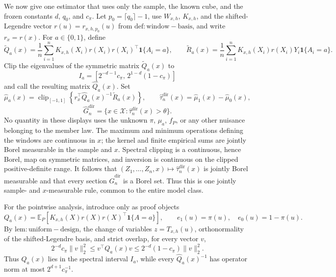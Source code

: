 We now give one estimator that uses only the sample, the known cube, and the frozen constants \(d\), \(q_0\), and \(c_\pi\). Let \(p_0=\lceil q_0\rceil-1\), use \(W_{x,h}\), \(K_{x,h}\), and the shifted-Legendre vector \(r(u)=r_{x,h,p_0}(u)\) from \(\mathrm{def:window-basis}\), and write \(r_x=r(x)\). For \(a\in\{0,1\}\), define
\[
\widetilde Q_a(x)=\frac1n\sum_{i=1}^nK_{x,h}(X_i)r(X_i)r(X_i)^\top\mathbf 1\{A_i=a\},
\qquad
\widetilde R_a(x)=\frac1n\sum_{i=1}^nK_{x,h}(X_i)r(X_i)Y_i\mathbf 1\{A_i=a\}.
\]
Clip the eigenvalues of the symmetric matrix \(\widetilde Q_a(x)\) to
\[
I_a=[2^{-d-1}c_\pi,\,2^{1-d}(1-c_\pi)]
\]
and call the resulting matrix \(\widehat Q_a(x)\). Set
\[
\widehat\mu_a(x)=\operatorname{clip}_{[-1,1]}\!\left\{r_x^\top\widehat Q_a(x)^{-1}\widetilde R_a(x)\right\},
\qquad
\widehat\tau_n^{\mathrm{dir}}(x)=\widehat\mu_1(x)-\widehat\mu_0(x),
\]
\[
\widehat G_n^{\mathrm{dir}}=\{x\in\mathcal X:\widehat\tau_n^{\mathrm{dir}}(x)>\theta\}.
\]
No quantity in these displays uses the unknown \(\pi\), \(\mu_a\), \(f_P\), or any other nuisance belonging to the member law. The maximum and minimum operations defining the windows are continuous in \(x\); the kernel and finite empirical sums are jointly Borel measurable in the sample and \(x\). Spectral clipping is a continuous, hence Borel, map on symmetric matrices, and inversion is continuous on the clipped positive-definite range. It follows that \((Z_1,\ldots,Z_n,x)\mapsto\widehat\tau_n^{\mathrm{dir}}(x)\) is jointly Borel measurable and that every section \(\widehat G_n^{\mathrm{dir}}\) is a Borel set. Thus this is one jointly sample- and \(x\)-measurable rule, common to the entire model class.

For the pointwise analysis, introduce only as proof objects
\[
Q_a(x)=\mathbb E_P\!\left[K_{x,h}(X)r(X)r(X)^\top\mathbf 1\{A=a\}\right],
\qquad e_1(u)=\pi(u),\quad e_0(u)=1-\pi(u).
\]
By \(\mathrm{lem:uniform-design}\), the change of variables \(z=T_{x,h}(u)\), orthonormality of the shifted-Legendre basis, and strict overlap, for every vector \(v\),
\[
2^{-d}c_\pi\|v\|_2^2
\le v^\top Q_a(x)v
\le2^{-d}(1-c_\pi)\|v\|_2^2.
\]
Thus \(Q_a(x)\) lies in the spectral interval \(I_a\), while every \(\widehat Q_a(x)^{-1}\) has operator norm at most \(2^{d+1}c_\pi^{-1}\).

